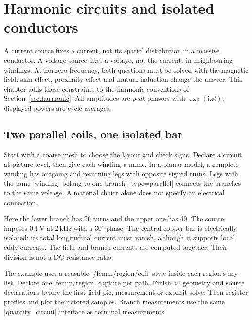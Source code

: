 \section{Harmonic circuits and isolated conductors}
\label{sec:ac-circuits}

A current source fixes a current, not its spatial distribution in a massive
conductor. A voltage source fixes a voltage, not the currents in neighbouring
windings. At nonzero frequency, both questions must be solved with the magnetic
field: skin effect, proximity effect and mutual induction change the answer.
This chapter adds those constraints to the harmonic conventions of
Section~\ref{sec:harmonic}. All amplitudes are \emph{peak} phasors with
$\exp(\mathrm i\omega t)$; displayed powers are cycle averages.

\subsection{Two parallel coils, one isolated bar}
Start with a coarse mesh to choose the layout and check signs. Declare a
circuit at picture level, then give each winding a name. In a planar model,
a complete winding has outgoing and returning legs with opposite signed
turns. Legs with the same |winding| belong to one branch; |type=parallel|
connects the branches to the same voltage. A material choice alone does not
specify an electrical connection.

Here the lower branch has 20 turns and the upper one has 40. The source imposes
$0.1\,\mathrm V$ at $2\,\mathrm{kHz}$ with a $30^\circ$ phase. The central
copper bar is electrically isolated: its total longitudinal current must vanish,
although it supports local eddy currents. The field and branch currents are
computed together. Their division is not a DC resistance ratio.


The example uses a reusable |/femm/region/coil| style inside each region's key
list. Declare one |femm/region| capture per path. Finish all geometry and source
declarations before the first field pic, measurement or explicit solve. Then
register profiles and plot their stored samples. Branch measurements use the
same |quantity=circuit| interface as terminal measurements.

